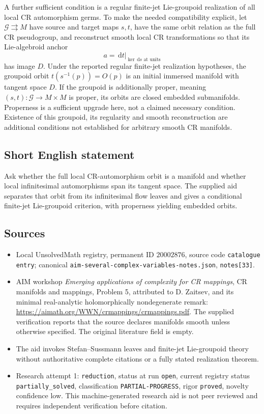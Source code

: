 \documentclass[11pt]{article}
\newcommand{\dd}{\,\mathrm{d}}
\begin{document}
A further sufficient condition is a regular finite-jet Lie-groupoid realization of all local CR automorphism germs. To make the needed compatibility explicit, let $\mathcal G\rightrightarrows M$ have source and target maps $s,t$, have the same orbit relation as the full CR pseudogroup, and reconstruct smooth local CR transformations so that its Lie-algebroid anchor
\[
a=\left.\dd t\right|_{\ker\dd s\text{ at units}}
\]
has image $D$. Under the reported regular finite-jet realization hypotheses, the groupoid orbit $t(s^{-1}(p))=O(p)$ is an initial immersed manifold with tangent space $D$. If the groupoid is additionally proper, meaning $(s,t):\mathcal G\to M\times M$ is proper, its orbits are closed embedded submanifolds. Properness is a sufficient upgrade here, not a claimed necessary condition. Existence of this groupoid, its regularity and smooth reconstruction are additional conditions not established for arbitrary smooth CR manifolds.
\subsection{Short English statement}
Ask whether the full local CR-automorphism orbit is a manifold and whether local infinitesimal automorphisms span its tangent space. The supplied aid separates that orbit from its infinitesimal flow leaves and gives a conditional finite-jet Lie-groupoid criterion, with properness yielding embedded orbits.
\subsection{Sources}
\begin{itemize}
\item Local UnsolvedMath registry, permanent ID $20002876$, source code \texttt{catalogue entry}; canonical \texttt{aim-several-complex-variables-notes.json}, \texttt{notes[33]}.
\item AIM workshop \emph{Emerging applications of complexity for CR mappings}, CR manifolds and mappings, Problem 5, attributed to D. Zaitsev, and its minimal real-analytic holomorphically nondegenerate remark: \url{https://aimath.org/WWN/crmappings/crmappings.pdf}. The supplied verification reports that the source declares manifolds smooth unless otherwise specified. The original literature field is empty.
\item The aid invokes Stefan--Sussmann leaves and finite-jet Lie-groupoid theory without authoritative complete citations or a fully stated realization theorem.
\item Research attempt 1: \texttt{reduction}, status at run \texttt{open}, current registry status \texttt{partially\_solved}, classification \texttt{PARTIAL-PROGRESS}, rigor \texttt{proved}, novelty confidence low. This machine-generated research aid is not peer reviewed and requires independent verification before citation.
\end{itemize}
\end{document}
